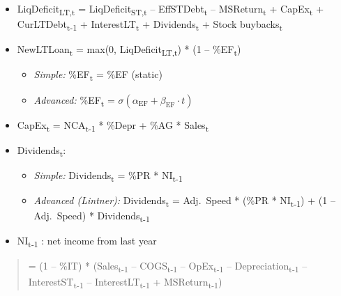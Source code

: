 \documentclass[12pt,a4paper]{article}
\begin{document}
\begin{itemize}
\item
  LiqDeficit\textsubscript{LT,t} = LiqDeficit\textsubscript{ST,t} --
  EffSTDebt\textsubscript{t} -- MSReturn\textsubscript{t} +
  CapEx\textsubscript{t} + CurLTDebt\textsubscript{t-1} +
  InterestLT\textsubscript{t} + Dividends\textsubscript{t} + Stock
  buybacks\textsubscript{t}
\item
  NewLTLoan\textsubscript{t} = max(0,
  LiqDeficit\textsubscript{LT,t}) * (1 -- \%EF\textsubscript{t})

  \begin{itemize}
  \item
    \textit{Simple:}\; \%EF\textsubscript{t} = \%EF \quad (static)
  \item
    \textit{Advanced:}\; \%EF\textsubscript{t} =
    $\sigma(\alpha_{\text{EF}} + \beta_{\text{EF}} \cdot t)$
  \end{itemize}
\item
  CapEx\textsubscript{t} = NCA\textsubscript{t-1} * \%Depr + \%AG *
  Sales\textsubscript{t}
\item
  Dividends\textsubscript{t}:

  \begin{itemize}
  \item
    \textit{Simple:}\;
    Dividends\textsubscript{t} = \%PR * NI\textsubscript{t-1}
  \item
    \textit{Advanced (Lintner):}\;
    Dividends\textsubscript{t} = Adj.\ Speed * (\%PR *
    NI\textsubscript{t-1}) + (1 -- Adj.\ Speed) *
    Dividends\textsubscript{t-1}
  \end{itemize}
\item
  NI\textsubscript{t-1} : net income from last year
\end{itemize}

\begin{quote}
= (1 -- \%IT) * (Sales\textsubscript{t-1} -- COGS\textsubscript{t-1} --
OpEx\textsubscript{t-1} -- Depreciation\textsubscript{t-1} --
InterestST\textsubscript{t-1} -- InterestLT\textsubscript{t-1} +
MSReturn\textsubscript{t-1})
\end{quote}
\end{document}
